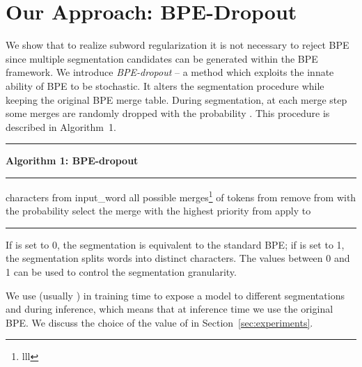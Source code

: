 \documentclass[11pt,a4paper]{article}
\begin{document}
 
\section{Our Approach: BPE-Dropout}\label{sec:method}



We show that to realize subword regularization it is not necessary to reject BPE since multiple segmentation candidates can be generated within the BPE framework. We introduce \textit{BPE-dropout} -- a method which exploits the innate ability of BPE to be stochastic. It alters the segmentation procedure while keeping the original BPE merge table. During segmentation, at each merge step some merges are randomly dropped with the probability . This procedure is described in Algorithm~1.

\vspace{-1ex}


\begin{algorithm}
 \vspace{5px}
 \hrule
 \vspace{3px}
 \textbf{Algorithm 1: BPE-dropout} \hrule
 \label{alg:bpedrop}
     characters from input\_word\;
     {
         all possible merges\footnote{lll} of tokens from \;
         {
            remove  from  with the probability \; } 
         {
             select the merge with the highest priority from \;
            apply  to \;
        }
    }
    \;
 \hrule
 
\end{algorithm}

 \vspace{-1ex}


If  is set to 0, the segmentation is equivalent to the standard BPE; if  is set to 1, the segmentation splits words into distinct characters. The values between 0 and 1 can be used to control the segmentation granularity. 

We use  (usually ) in training time to expose a model to different segmentations and  during inference, which means that at inference time we use the original BPE. We discuss the choice of the value of  in Section~\ref{sec:experiments}.
\end{document}
